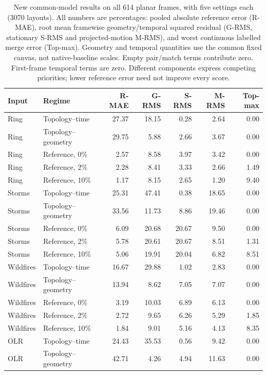 \begin{table}[t]
\caption{New common-model results on all 614 planar frames, with five settings each (3070 layouts). All numbers are percentages: pooled absolute reference error (R-MAE), root mean framewise geometry/temporal squared residual (G-RMS, stationary S-RMS and projected-motion M-RMS), and worst continuous labelled merge error (Top-max). Geometry and temporal quantities use the common fixed canvas, not native-baseline scales. Empty pair/match terms contribute zero. First-frame temporal terms are zero. Different components express competing priorities; lower reference error need not improve every score.}\label{tab:unified_regimes}
\centering\small
\begin{tabular}{llrrrrr}\toprule
Input & Regime & R-MAE & G-RMS & S-RMS & M-RMS & Top-max\\\midrule
Ring & Topology--time & 27.37 & 18.15 & 0.28 & 2.64 & 0.00 \\
Ring & Topology--geometry & 29.75 & 5.88 & 2.66 & 3.67 & 0.00 \\
Ring & Reference, 0\% & 2.57 & 8.58 & 3.97 & 3.42 & 0.00 \\
Ring & Reference, 2\% & 2.28 & 8.41 & 3.33 & 2.66 & 1.49 \\
Ring & Reference, 10\% & 1.17 & 8.15 & 2.65 & 1.20 & 9.40 \\
Storms & Topology--time & 25.31 & 47.41 & 0.38 & 18.65 & 0.00 \\
Storms & Topology--geometry & 33.56 & 11.73 & 8.86 & 19.46 & 0.00 \\
Storms & Reference, 0\% & 6.09 & 20.68 & 20.67 & 9.50 & 0.00 \\
Storms & Reference, 2\% & 5.78 & 20.61 & 20.67 & 8.51 & 1.31 \\
Storms & Reference, 10\% & 5.06 & 19.91 & 20.04 & 6.82 & 8.51 \\
Wildfires & Topology--time & 16.67 & 29.88 & 1.02 & 2.83 & 0.00 \\
Wildfires & Topology--geometry & 13.94 & 8.62 & 7.05 & 7.07 & 0.00 \\
Wildfires & Reference, 0\% & 3.19 & 10.03 & 6.89 & 6.13 & 0.00 \\
Wildfires & Reference, 2\% & 2.72 & 9.65 & 6.26 & 5.29 & 1.85 \\
Wildfires & Reference, 10\% & 1.84 & 9.01 & 5.16 & 4.13 & 8.35 \\
OLR & Topology--time & 24.43 & 35.53 & 0.56 & 9.42 & 0.00 \\
OLR & Topology--geometry & 42.71 & 4.26 & 4.94 & 11.63 & 0.00 \\

\end{tabular}
\end{table}

